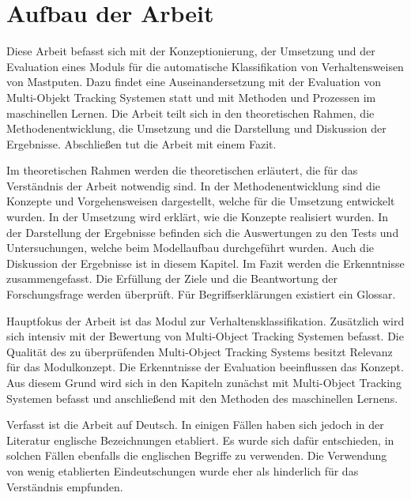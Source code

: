 \section{Aufbau der Arbeit}
Diese Arbeit befasst sich mit der Konzeptionierung, der Umsetzung und der Evaluation eines Moduls für die automatische Klassifikation von Verhaltensweisen von Mastputen. Dazu findet eine Auseinandersetzung mit der Evaluation von Multi-Objekt Tracking Systemen statt und mit Methoden und Prozessen im maschinellen Lernen. Die Arbeit teilt sich in den theoretischen Rahmen, die Methodenentwicklung, die Umsetzung und die Darstellung und Diskussion der Ergebnisse. Abschließen tut die Arbeit mit einem Fazit. \par

Im theoretischen Rahmen werden die theoretischen erläutert, die für das Verständnis der Arbeit notwendig sind. In der Methodenentwicklung sind die Konzepte und Vorgehensweisen dargestellt, welche für die Umsetzung entwickelt wurden. In der Umsetzung wird erklärt, wie die Konzepte realisiert wurden. In der Darstellung der Ergebnisse befinden sich die Auswertungen zu den Tests und Untersuchungen, welche beim Modellaufbau durchgeführt wurden. Auch die Diskussion der Ergebnisse ist in diesem Kapitel. Im Fazit werden die Erkenntnisse zusammengefasst. Die Erfüllung der Ziele und die Beantwortung der Forschungsfrage werden überprüft. Für Begriffserklärungen existiert ein Glossar.\par

Hauptfokus der Arbeit ist das Modul zur Verhaltensklassifikation. Zusätzlich wird sich intensiv mit der Bewertung von Multi-Object Tracking Systemen befasst. Die Qualität des zu überprüfenden Multi-Object Tracking Systems besitzt Relevanz für das Modulkonzept. Die Erkenntnisse der Evaluation beeinflussen das Konzept. Aus diesem Grund wird sich in den Kapiteln zunächst mit Multi-Object Tracking Systemen befasst und anschließend mit den Methoden des maschinellen Lernens.\par

Verfasst ist die Arbeit auf Deutsch. In einigen Fällen haben sich jedoch in der Literatur englische Bezeichnungen etabliert. Es wurde sich dafür entschieden, in solchen Fällen ebenfalls die englischen Begriffe zu verwenden. Die Verwendung von wenig etablierten Eindeutschungen wurde eher als hinderlich für das Verständnis empfunden. \par


